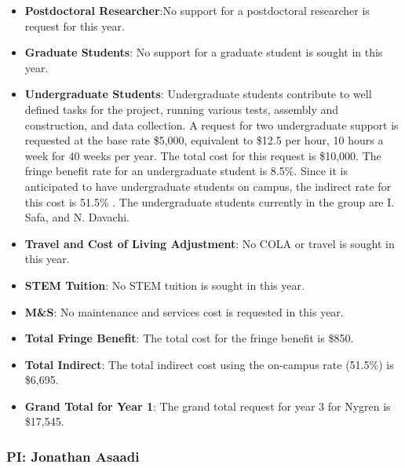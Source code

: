 \begin{enumerate}
\begin{itemize}[noitemsep,nolistsep]
\item {{\bf Postdoctoral Researcher}:No support for a postdoctoral researcher is request for this year.} 

\item{{\bf Graduate Students}: No support for a graduate student is sought in this year.}

\item {{\bf Undergraduate Students}: Undergraduate students contribute to well defined tasks for the project, running various tests, assembly and construction, and data collection.  A request for two undergraduate support is requested at the base rate \$5,000, equivalent to \$12.5 per hour, 10 hours a week for 40 weeks per year.  The total cost for this request is \$10,000.  The fringe benefit rate for an undergraduate student is 8.5\%.  Since it is anticipated to have undergraduate students on campus, the indirect rate for this cost is 51.5\% .  The undergraduate students currently in the group are I. Safa, and N. Davachi.}

\item{{\bf Travel and Cost of Living Adjustment}: No COLA or travel is sought in this year.}

\item {{\bf STEM Tuition}: No STEM tuition is sought in this year.}

\item {{\bf M\&S}: No maintenance and services cost is requested in this year.}

\item {{\bf Total Fringe Benefit}: The total cost for the fringe benefit is \$850.}

\item {{\bf Total Indirect}: The total indirect cost using the on-campus rate (51.5\%) is \$6,695.}

\item {{\bf Grand Total for Year 1}: The grand total request for year 3 for Nygren is \$17,545.}

\end{itemize}

\end{enumerate}




\newpage

\subsubsection{\bf PI: Jonathan Asaadi}

